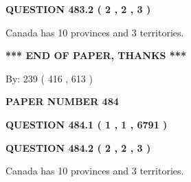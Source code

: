 \documentclass[12pt]{article}
\begin{document}
\vspace{0.2in}
  
{\textbf{\Large{QUESTION
483.2 
 ( 2 , 2 , 3 )
}}}
  
  
 
 
\noindent{}
 
 
Canada has 10  provinces and 3 territories.
 
 
 
 
   
   
 \vspace{0.2in}
 
   
   
   
   
\vspace{1.0in} 
{\textbf{\large{ *** END OF PAPER, THANKS *** }}} 
   
   
\hspace{1.0in} By: 
 239 ( 416 ,  613 )
   
   
   
   
\newpage 
\setcounter{page}{ 
   484001 } 
   
   
   
   
 {\textbf{ \Large{ PAPER NUMBER  484  }}}
   
   
\vspace{0.2in}
   
   
   
   
   
   
 \vspace{0.2in}
 
 
 
 
   
   
  
\vspace{0.2in}
  
{\textbf{\Large{QUESTION
484.1 
 ( 1 , 1 , 6791 )
}}}
  
  
  
\vspace{0.2in}
  
{\textbf{\Large{QUESTION
484.2 
 ( 2 , 2 , 3 )
}}}
  
  
 
 
\noindent{}
 
 
Canada has 10  provinces and 3 territories.
 
\end{document}
